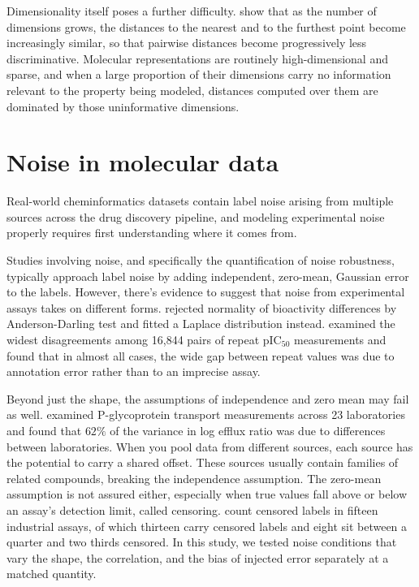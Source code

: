 Dimensionality itself poses a further difficulty. \citet{Aggarwal2001} show that as the number of dimensions grows, the distances to the nearest and to the furthest
point become increasingly similar, so that pairwise distances become progressively less discriminative. Molecular representations are routinely high-dimensional and sparse, and when a
large proportion of their dimensions carry no information relevant to the property being modeled, distances computed over them are dominated by those uninformative dimensions.



\section{Noise in molecular data}

Real-world cheminformatics datasets contain label noise arising from multiple sources across the drug discovery pipeline, and modeling experimental noise properly requires first understanding where it comes from.

Studies involving noise, and specifically the quantification of noise robustness, typically approach label noise by adding independent, zero-mean, Gaussian error to the labels. However, there's evidence to suggest that noise from experimental assays takes on different forms. \citet{Kruger2012} rejected normality of bioactivity differences by Anderson-Darling test and fitted a Laplace distribution instead. \citet{Kalliokoski2013} examined the widest disagreements among 16,844 pairs of repeat pIC$_{50}$ measurements and found that in almost all cases, the wide gap between repeat values was due to annotation error rather than to an imprecise assay.

Beyond just the shape, the assumptions of independence and zero mean may fail as well. \citet{Bentz2013} examined P-glycoprotein transport measurements across 23 laboratories and found that $62\%$ of the variance in log efflux ratio was due to differences between laboratories. When you pool data from different sources, each source has the potential to carry a shared offset. These sources usually contain families of related compounds, breaking the independence assumption. The zero-mean assumption is not assured either, especially when true values fall above or below an assay's detection limit, called censoring. \citet{Svensson2025} count censored labels in fifteen industrial assays, of which thirteen carry censored labels and eight sit between a quarter and two thirds censored. In this study, we tested noise conditions that vary the shape, the correlation, and the bias of injected error separately at a matched quantity.  


